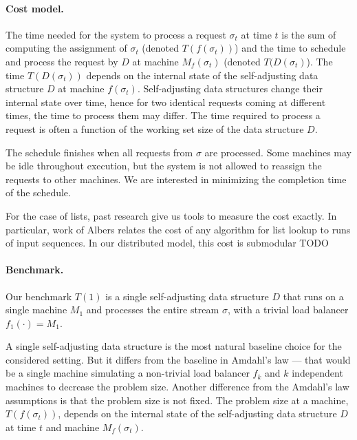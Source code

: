 \paragraph{Cost model.}

The time needed for the system to process a request $\sigma_t$ at time $t$ is the sum of computing the assignment of $\sigma_t$ (denoted $T(f(\sigma_t))$) and the time to schedule and process the request by $D$ at machine $M_f(\sigma_t)$ (denoted $T(D(\sigma_t)$).
The time $T(D(\sigma_t))$ depends on the internal state of the self-adjusting data structure $D$ at machine $f(\sigma_t)$.
Self-adjusting data structures change their internal state over time, hence for two identical requests coming at different times, the time to process them may differ.
The time required to process a request is often a function of the working set size of the data structure $D$. 


The schedule finishes when all requests from $\sigma$ are processed. Some machines may be idle throughout execution, but the system is not allowed to reassign the requests to other machines.
We are interested in minimizing the completion time of the schedule.


For the case of lists, past research give us tools to measure the cost exactly. In particular, work of Albers relates the cost of any algorithm for list lookup to runs of input sequences.
In our distributed model, this cost is submodular TODO



\paragraph*{Benchmark.}
Our benchmark $T(1)$ is a single self-adjusting data structure $D$ that runs on a single machine $M_1$
and processes the entire stream $\sigma$, with a trivial load balancer $f_1(\cdot) = M_1$.

A single self-adjusting data structure is the most natural baseline choice for the considered setting. But it differs from the baseline in Amdahl's law --- that would be a single machine simulating a non-trivial load balancer $f_k$ and $k$ independent machines to decrease the problem size. Another difference from the Amdahl's law assumptions is that the problem size is not fixed. The problem size at a machine, $T(f(\sigma_t))$, depends on the internal state of the self-adjusting data structure $D$ at time $t$ and machine $M_f(\sigma_t)$.


